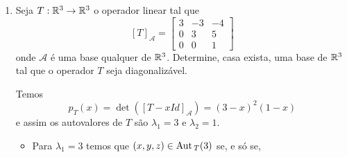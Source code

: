 \begin{exemplo}
\begin{enumerate}
\begin{solucao}
\begin{itemize}
\[				\]
				isto \'e, $x = iy$. Logo
				\[
					\aut_T(i) = \{(iy,y) \in \complex^2 \mid y \in \complex\} = [(i,1)].
				\]
				Assim, $\mathcal{B}_1 = \{(i,1)\}$ \'e uma base de $\aut_T(i)$ e da{\'\i} $\dim_\complex\aut_T(i) = 1$.
				\item Para $\lambda_1 = -i$ temos:
				\[
					[T + iId]_\mathcal{A} = \begin{bmatrix} i & -1\\1 & i\end{bmatrix}
				\]
				e assim $(x,y) \in \aut_T(-i)$ se, e s\'o se,
				\[
					\begin{bmatrix} i & -1\\1 & i\end{bmatrix} \begin{bmatrix} x\\y\end{bmatrix}	 = \begin{bmatrix} 0\\0\end{bmatrix},
				\]
				isto \'e, $x = -iy$. Logo
				\[
					\aut_T(-i) = \{(-iy,y) \in \complex^2 \mid y \in \complex\} = [(-i,1)].
				\]
				Assim, $\mathcal{B}_2 = \{(-i,1)\}$ \'e uma base de $\aut_T(-i)$ e da{\'\i} $\dim_\complex\aut_T(-i) = 1$.
			\end{itemize}
			Agora o conjunto $\mathcal{B} = \mathcal{B}_1 \cup \mathcal{B}_2 = \{(i,1);(-i,1)\}$ \'e uma base de $\complex^2$ e nesta base temos
			\[
				[T]_\mathcal{B} = \begin{bmatrix} i & 0\\0 & -i\end{bmatrix}.
			\]
		\end{solucao}
		\item Seja $T : \mathbb{R}^3 \to \mathbb{R}^3$ o operador linear tal que
		\[
			[T]_\mathcal{A} = \begin{bmatrix}
								3 & -3 & -4\\
								0 & 3 & 5\\
								0 & 0 & 1
							\end{bmatrix}
		\]
		onde $\mathcal{A}$ \'e uma base qualquer de $\mathbb{R}^3$. Determine, casa exista, uma base de $\mathbb{R}^3$ tal que o operador $T$ seja diagonaliz\'avel.
		\begin{solucao}
			Temos
			\[
				p_T(x) = \det([T - xId]_\mathcal{A}) = (3 - x)^2(1 - x)
			\]
			e assim os autovalores de $T$ s\~ao $\lambda_1 = 3$ e $\lambda_2 = 1$.
			\begin{itemize}
				\item Para $\lambda_1 = 3$ temos que $(x,y,z) \in {\rm Aut\,}_T(3)$ se, e s\'o se,

\end{itemize}
\end{solucao}
\end{enumerate}
\end{exemplo}
